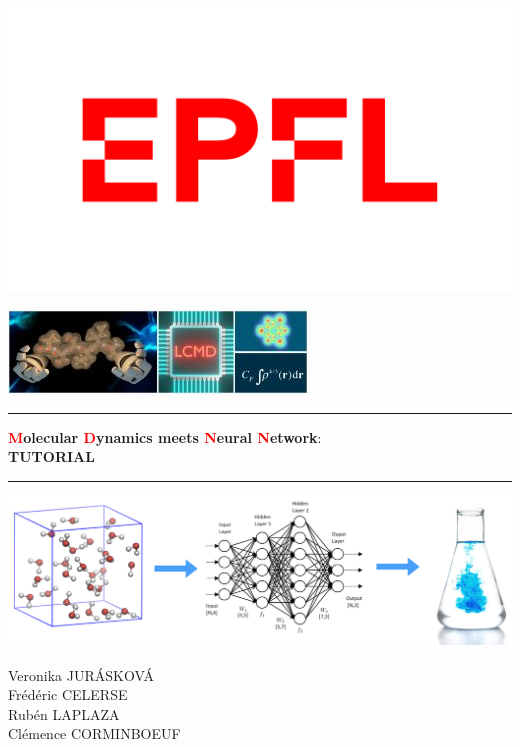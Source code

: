 \documentclass[12pt]{article}
\newcommand\Warning{%
 \makebox[1.4em][c]{%
 \makebox[0pt][c]{\raisebox{.1em}{\small!}}%
 \makebox[0pt][c]{\color{red}\Large$\bigtriangleup$}}}%
\begin{document}
\begin{minipage}[c]{0.5\linewidth}
\includegraphics[scale=0.2]{EPFL-logo.png}
\end{minipage}
\begin{minipage}[c]{0.5\linewidth}
\includegraphics[scale=0.75]{lcmd-logo.jpg}
\end{minipage}
\vspace{0.5cm}
\hrule 
\vspace{0.5cm}
\begin{center}
\LARGE \textbf{\textcolor{red}{M}olecular \textcolor{red}{D}ynamics meets \textcolor{red}{N}eural \textcolor{red}{N}etwork}: \\
\LARGE \textbf{TUTORIAL}
\vspace{0.5cm}
\\ %
\end{center}
\hrule 
\vspace{2cm}
\begin{center}
\includegraphics[scale=0.17]{Picture.jpeg}
\end{center}
\vspace{1cm}
\begin{center}
    Veronika JURÁSKOVÁ \\
    Frédéric CELERSE \\
    Rubén LAPLAZA \\
    Clémence CORMINBOEUF
\end{center}
 
\end{document}

